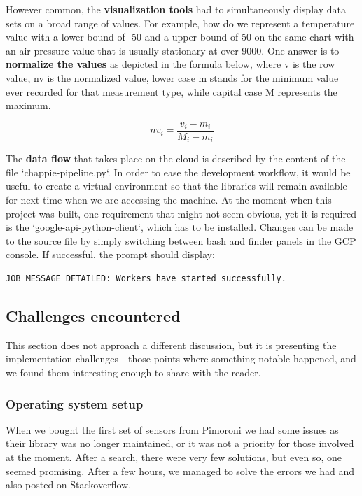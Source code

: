 However common, the \textbf{visualization tools} had to simultaneously display data sets on a broad range of values. For example, how do we represent a temperature value with a lower bound of -50 and a upper bound of 50 on the same chart with an air pressure value that is usually stationary at over 9000. One answer is to \textbf{normalize the values} as depicted in the formula below, where v is the row value, nv is the normalized value, lower case m stands for the minimum value ever recorded for that measurement type, while capital case M represents the maximum.

\begin{equation}
nv_i = \frac{v_i - m_i}{M_i - m_i}  
\end{equation}

The \textbf{data flow} that takes place on the cloud is described by the content of the file `chappie-pipeline.py`. In order to ease the development workflow, it would be useful to create a virtual environment so that the libraries will remain available for next time when we are accessing the machine. At the moment when this project was built, one requirement that might not seem obvious, yet it is required is the `google-api-python-client`, which has to be installed. Changes can be made to the source file by simply switching between bash and finder panels in the GCP console. If successful, the prompt should display:
\begin{lstlisting}[language=bash]
JOB_MESSAGE_DETAILED: Workers have started successfully.
\end{lstlisting}

\clearpage
\subsection{Challenges encountered}

This section does not approach a different discussion, but it is presenting the implementation challenges - those points where something notable happened, and we found them interesting enough to share with the reader.

\subsubsection{Operating system setup}

When we bought the first set of sensors from Pimoroni we had some issues as their library was no longer maintained, or it was not a priority for those involved at the moment. After a search, there were very few solutions, but even so, one seemed promising. After a few hours, we managed to solve the errors we had and also posted on Stackoverflow. 

